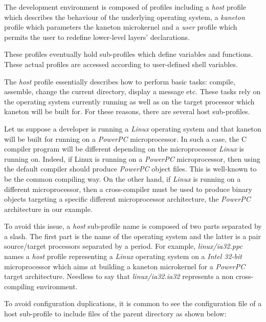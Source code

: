 The development environment is composed of profiles including a \textit{host}
profile which describes the behaviour of the underlying operating system, a
\textit{kaneton} profile which parameters the kaneton microkernel and a
\textit{user} profile which permits the user to redefine lower-level layers'
declarations.

These profiles eventually hold sub-profiles which define variables and
functions. These actual profiles are accessed according to user-defined
shell variables.



The \textit{host} profile essentially describes how to perform basic tasks:
compile, assemble, change the current directory, display a message etc. These
tasks rely on the operating system currently running as well as on the target
processor which kaneton will be built for. For these reasons, there are
several host sub-profiles.

Let us suppose a developer is running a \textit{Linux} operating system and
that kaneton will be built for running on a \textit{PowerPC} microprocessor. In
such a case, the C compiler program will be different depending on the
microprocessor \textit{Linux} is running on. Indeed, if Linux is running on
a \textit{PowerPC} microprocessor, then using the default compiler should
produce \textit{PowerPC} object files. This is well-known to be the common
compiling way. On the other hand, if \textit{Linux} is running on a
different microprocessor, then a cross-compiler must be used to produce
binary objects targeting a specific different microprocessor architecture,
the \textit{PowerPC} architecture in our example.

To avoid this issue, a \textit{host} sub-profile name is composed of two parts
separated by a slash. The first part is the name of the operating system and
the latter is a pair source/target processors separated by a period. For
example, \textit{linux/ia32.ppc} names a \textit{host} profile representing a
\textit{Linux} operating system on a \textit{Intel 32-bit} microprocessor
which aims at building a kaneton microkernel for a \textit{PowerPC}
target architecture. Needless to say that \textit{linux/ia32.ia32} represents
a non cross-compiling environment.

To avoid configuration duplications, it is common to see the configuration
file of a host sub-profile to include files of the parent directory as
shown below:

